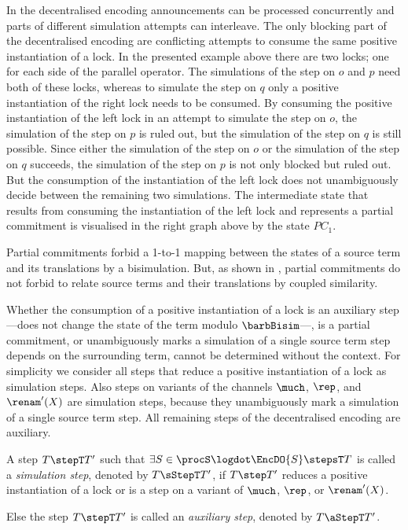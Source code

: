 \documentclass[copyright,creativecommons]{eptcs}
\begin{document}
  In the decentralised encoding announcements can be processed concurrently and parts of different simulation attempts can interleave. The only blocking part of the decentralised encoding are conflicting attempts to consume the same positive instantiation of a lock.
  In the presented example above there are two locks; one for each side of the parallel operator. The simulations of the step on $ o $ and $ p $ need both of these locks, whereas to simulate the step on $ q $ only a positive instantiation of the right lock needs to be consumed.
  By consuming the positive instantiation of the left lock in an attempt to simulate the step on $ o $, the simulation of the step on $ p $ is ruled out, but the simulation of the step on $ q $ is still possible. Since either the simulation of the step on $ o $ or the simulation of the step on $ q $ succeeds, the simulation of the step on $ p $ is not only blocked but ruled out. But the consumption of the instantiation of the left lock does not unambiguously decide between the remaining two simulations. The intermediate state that results from consuming the instantiation of the left lock and represents a partial commitment is visualised in the right graph above by the state $ PC_1 $.
  
  Partial commitments forbid a 1-to-1 mapping between the states of  a source term and its translations by a bisimulation. But, as shown in \cite{parrowCoupled92}, partial commitments do not forbid to relate source terms and their translations by coupled similarity.

Whether the consumption of a positive instantiation of a lock is an auxiliary step---does not change the state of the term modulo $ \barbBisim $---, is a partial commitment, or unambiguously marks a simulation of a single source term step depends on the surrounding term, \ie cannot be determined without the context. For simplicity we consider all steps that reduce a positive instantiation of a lock as simulation steps.
Also steps on variants of the channels $ \much $, $ \rep $, and $ \renam'(X) $ are simulation steps, because they unambiguously mark a simulation of a single source term step. All remaining steps of the decentralised encoding are auxiliary.

\begin{definition}
	A step $ T \stepT T' $ such that $ \exists S \in \procS\logdot \EncDO{S} \stepsT T $ is called a \emph{simulation step}, denoted by $ T \sStepT T' $, if $ T \step T' $ reduces a positive instantiation of a lock or is a step on a variant of $ \much $, $ \rep $, or $ \renam'(X) $.
	
	Else the step $ T \stepT T' $ is called an \emph{auxiliary step}, denoted by $ T \aStepT T' $.
	\label{def:auxStepsDecentral}
\end{definition}
\end{document}
